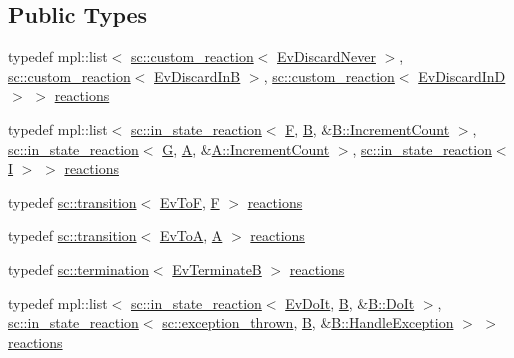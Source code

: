 \subsection*{Public Types}
\begin{DoxyCompactItemize}
\item 
typedef mpl\+::list$<$ \mbox{\hyperlink{classboost_1_1statechart_1_1custom__reaction}{sc\+::custom\+\_\+reaction}}$<$ \mbox{\hyperlink{struct_ev_discard_never}{Ev\+Discard\+Never}} $>$, \mbox{\hyperlink{classboost_1_1statechart_1_1custom__reaction}{sc\+::custom\+\_\+reaction}}$<$ \mbox{\hyperlink{struct_ev_discard_in_b}{Ev\+Discard\+InB}} $>$, \mbox{\hyperlink{classboost_1_1statechart_1_1custom__reaction}{sc\+::custom\+\_\+reaction}}$<$ \mbox{\hyperlink{struct_ev_discard_in_d}{Ev\+Discard\+InD}} $>$ $>$ \mbox{\hyperlink{struct_b_a2a510c568bd4f5254e154e713bcc7724}{reactions}}
\item 
typedef mpl\+::list$<$ \mbox{\hyperlink{classboost_1_1statechart_1_1in__state__reaction}{sc\+::in\+\_\+state\+\_\+reaction}}$<$ \mbox{\hyperlink{struct_f}{F}}, \mbox{\hyperlink{struct_b}{B}}, \&\mbox{\hyperlink{struct_b_a862e39288b607fcc7e71f9fa07c0cd20}{B\+::\+Increment\+Count}} $>$, \mbox{\hyperlink{classboost_1_1statechart_1_1in__state__reaction}{sc\+::in\+\_\+state\+\_\+reaction}}$<$ \mbox{\hyperlink{struct_g}{G}}, \mbox{\hyperlink{struct_a}{A}}, \&\mbox{\hyperlink{struct_a_a7811ed8883449fde0d5f59bd2ebf3de5}{A\+::\+Increment\+Count}} $>$, \mbox{\hyperlink{classboost_1_1statechart_1_1in__state__reaction}{sc\+::in\+\_\+state\+\_\+reaction}}$<$ \mbox{\hyperlink{struct_i}{I}} $>$ $>$ \mbox{\hyperlink{struct_b_a29fc5ace91a2e4f1854b15b8b301e458}{reactions}}
\item 
typedef \mbox{\hyperlink{classboost_1_1statechart_1_1transition}{sc\+::transition}}$<$ \mbox{\hyperlink{struct_ev_to_f}{Ev\+ToF}}, \mbox{\hyperlink{struct_f}{F}} $>$ \mbox{\hyperlink{struct_b_a0d7ad9cec2dd9d373b89c38a620756c0}{reactions}}
\item 
typedef \mbox{\hyperlink{classboost_1_1statechart_1_1transition}{sc\+::transition}}$<$ \mbox{\hyperlink{struct_ev_to_a}{Ev\+ToA}}, \mbox{\hyperlink{struct_a}{A}} $>$ \mbox{\hyperlink{struct_b_a3c296c27b9a29f5075166d4261902612}{reactions}}
\item 
typedef \mbox{\hyperlink{classboost_1_1statechart_1_1termination}{sc\+::termination}}$<$ \mbox{\hyperlink{struct_ev_terminate_b}{Ev\+TerminateB}} $>$ \mbox{\hyperlink{struct_b_a1ccdc4cf50c4df6bd758bb055b47dd01}{reactions}}
\item 
typedef mpl\+::list$<$ \mbox{\hyperlink{classboost_1_1statechart_1_1in__state__reaction}{sc\+::in\+\_\+state\+\_\+reaction}}$<$ \mbox{\hyperlink{struct_ev_do_it}{Ev\+Do\+It}}, \mbox{\hyperlink{struct_b}{B}}, \&\mbox{\hyperlink{struct_b_ad8417b0b86326962007c13d75094330e}{B\+::\+Do\+It}} $>$, \mbox{\hyperlink{classboost_1_1statechart_1_1in__state__reaction}{sc\+::in\+\_\+state\+\_\+reaction}}$<$ \mbox{\hyperlink{classboost_1_1statechart_1_1exception__thrown}{sc\+::exception\+\_\+thrown}}, \mbox{\hyperlink{struct_b}{B}}, \&\mbox{\hyperlink{struct_b_a8eb80df2fcfde5209e4800f5aec2d7a5}{B\+::\+Handle\+Exception}} $>$ $>$ \mbox{\hyperlink{struct_b_abbfe19dac6bb98dbb89c39caf2aa46d9}{reactions}}
\end{DoxyCompactItemize}
